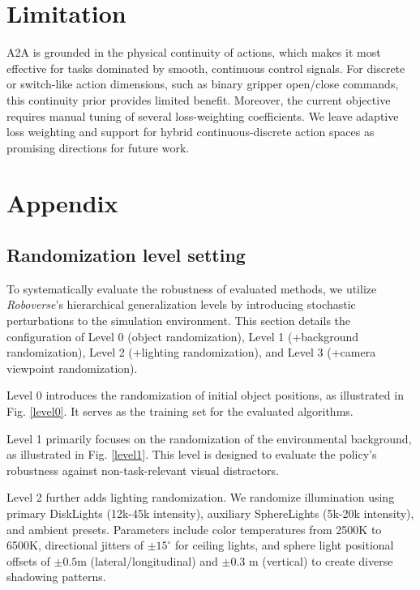 \documentclass[onecolumn]{fairmeta}
\newcommand{\m}[1]{{A2A}}
\begin{document}
\section{Limitation}
\m{} is grounded in the physical continuity of actions, which makes it most effective for tasks dominated by smooth, continuous control signals. For discrete or switch-like action dimensions, such as binary gripper open/close commands, this continuity prior provides limited benefit. Moreover, the current objective requires manual tuning of several loss-weighting coefficients. We leave adaptive loss weighting and support for hybrid continuous-discrete action spaces as promising directions for future work.
	
	\clearpage
	\newpage
	
	
	
	\clearpage
	\newpage
	
	\appendix
	
	\section{Appendix}
	
	\subsection{Randomization level setting} \label{appen_dr}
	
	To systematically evaluate the robustness of evaluated methods, we utilize \textit{Roboverse}'s hierarchical generalization levels by introducing stochastic perturbations to the simulation environment. This section details the configuration of Level 0 (object randomization), Level 1 (+background randomization), Level 2 (+lighting randomization), and Level 3 (+camera viewpoint randomization).
	
	Level 0 introduces the randomization of initial object positions, as illustrated in Fig. \ref{level0}. It serves as the training set for the evaluated algorithms.
	
	Level 1 primarily focuses on the randomization of the environmental background, as illustrated in Fig. \ref{level1}. This level is designed to evaluate the policy's robustness against non-task-relevant visual distractors.
	
	Level 2 further adds lighting randomization. We randomize illumination using primary DiskLights (12k-45k intensity), auxiliary SphereLights (5k-20k intensity), and ambient presets. Parameters include color temperatures from 2500K to 6500K, directional jitters of $\pm 15^\circ$ for ceiling lights, and sphere light positional offsets of $\pm 0.5$m (lateral/longitudinal) and $\pm 0.3$ m (vertical) to create diverse shadowing patterns.
	
\end{document}
